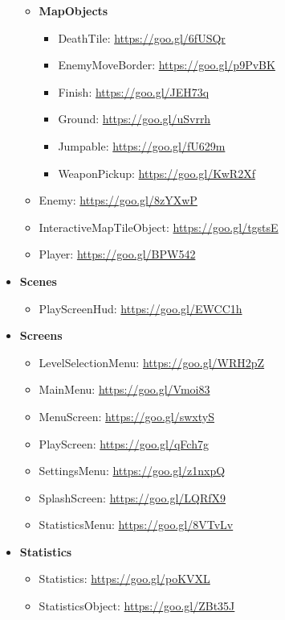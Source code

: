 \documentclass[12p]{article}
\begin{document}
\begin{itemize}
\begin{itemize}
        \item[\faFolderOpen] \textbf{MapObjects}
        \begin{itemize}
            \item DeathTile: \url{https://goo.gl/6fUSQr}
            \item EnemyMoveBorder: \url{https://goo.gl/p9PvBK}
            \item Finish: \url{https://goo.gl/JEH73q}
            \item Ground: \url{https://goo.gl/uSvrrh}
            \item Jumpable: \url{https://goo.gl/fU629m}
            \item WeaponPickup: \url{https://goo.gl/KwR2Xf}
        \end{itemize}
        
        \item Enemy: \url{https://goo.gl/8zYXwP}
        \item InteractiveMapTileObject: \url{https://goo.gl/tgstsE}
        \item Player: \url{https://goo.gl/BPW542}
    \end{itemize}
    
    \item \textbf{Scenes}
    \begin{itemize}
        \item PlayScreenHud: \url{https://goo.gl/EWCC1h}
    \end{itemize}
    
    \item \textbf{Screens}
    \begin{itemize}
        \item LevelSelectionMenu: \url{https://goo.gl/WRH2pZ}
        \item MainMenu: \url{https://goo.gl/Vmoi83}
        \item MenuScreen: \url{https://goo.gl/swxtyS}
        \item PlayScreen: \url{https://goo.gl/qFch7g}
        \item SettingsMenu: \url{https://goo.gl/z1nxpQ}
        \item SplashScreen: \url{https://goo.gl/LQRfX9}
        \item StatisticsMenu: \url{https://goo.gl/8VTvLv}
    \end{itemize}
    
    \item \textbf{Statistics}
    \begin{itemize}
        \item Statistics: \url{https://goo.gl/poKVXL}
        \item StatisticsObject: \url{https://goo.gl/ZBt35J}
    \end{itemize}
    

\end{itemize}
\end{document}
